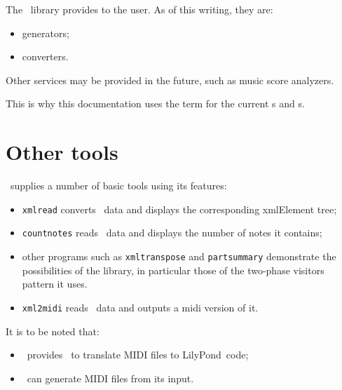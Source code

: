 The \mf\ library provides  to the user. As of this writing, they are:
\begin{itemize}
\item generators;
\item converters.
\end{itemize}

Other services may be provided in the future, such as music score analyzers.

This is why this documentation uses the term  for the current \generator s and \converter s.


\section{Other tools}

\libmusicxml\ supplies a number of basic tools using its features:

\begin{itemize}
\item {\tt xmlread} converts \mxml\ data and displays the corresponding xmlElement tree;

\item {\tt countnotes} reads \mxml\ data and displays the number of notes it contains;

\item other programs such as {\tt xmltranspose} and {\tt partsummary} demonstrate the possibilities of the library, in particular those of the two-phase visitors pattern it uses.

\item {\tt xml2midi} reads \mxml\ data and outputs a midi version of it.
\end{itemize}

It is to be noted that:
\begin{itemize}
\item \lily\ provides \midiToLy\ to translate MIDI files to LilyPond\ code;
\item \lily\ can generate MIDI files from its input.
\end{itemize}


